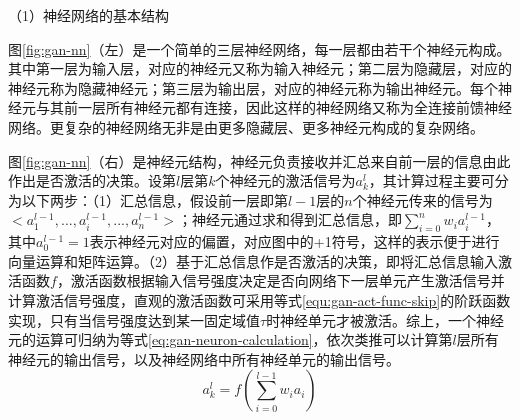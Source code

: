 （1）神经网络的基本结构

图\ref{fig:gan-nn}（左）是一个简单的三层神经网络，每一层都由若干个神经元构成。其中第一层为输入层，对应的神经元又称为输入神经元；第二层为隐藏层，对应的神经元称为隐藏神经元；第三层为输出层，对应的神经元称为输出神经元。每个神经元与其前一层所有神经元都有连接，因此这样的神经网络又称为全连接前馈神经网络。更复杂的神经网络无非是由更多隐藏层、更多神经元构成的复杂网络。

图\ref{fig:gan-nn}（右）是神经元结构，神经元负责接收并汇总来自前一层的信息由此作出是否激活的决策。设第$l$层第$k$个神经元的激活信号为$a_{k}^{l}$，其计算过程主要可分为以下两步：（1）汇总信息，假设前一层即第$l-1$层的$n$个神经元传来的信号为$<a_{1}^{l-1},...,a_{i}^{l-1}, ..., a_{n}^{l-1}>$；神经元通过求和得到汇总信息，即$\sum_{i=0}^{n}w_{i}a_{i}^{l-1}$，其中$a_{0}^{l-1}=1$表示神经元对应的偏置，对应图中的+1符号，这样的表示便于进行向量运算和矩阵运算。（2）基于汇总信息作是否激活的决策，即将汇总信息输入激活函数$f$，激活函数根据输入信号强度决定是否向网络下一层单元产生激活信号并计算激活信号强度，直观的激活函数可采用等式\ref{equ:gan-act-func-skip}的阶跃函数实现，只有当信号强度达到某一固定域值$\tau$时神经单元才被激活。综上，一个神经元的运算可归纳为等式\ref{eq:gan-neuron-calculation}，依次类推可以计算第$l$层所有神经元的输出信号，以及神经网络中所有神经单元的输出信号。
\begin{equation}
\label{eq:gan-neuron-calculation}
a_{k}^{l}=f(\sum_{i=0}^{l-1}w_{i}a_{i})
\end{equation}

